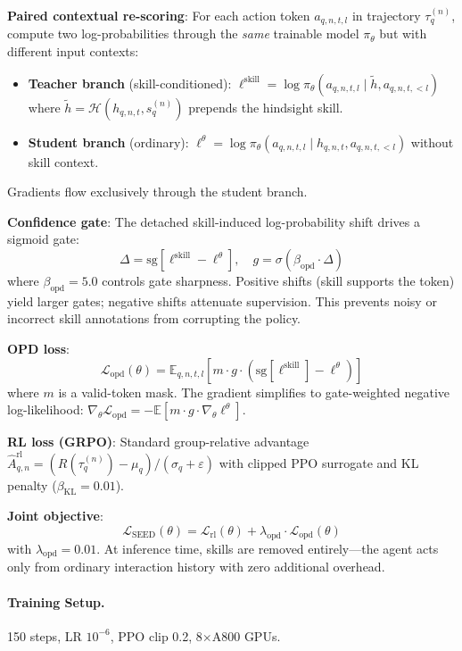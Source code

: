 \documentclass[11pt,a4paper]{article}
\begin{document}
\textbf{Paired contextual re-scoring}: For each action token $a_{q,n,t,l}$ in trajectory $\tau_q^{(n)}$, compute two log-probabilities through the \emph{same} trainable model $\pi_\theta$ but with different input contexts:
\begin{itemize}
\item \textbf{Teacher branch} (skill-conditioned): $\ell^{\mathrm{skill}} = \log \pi_\theta(a_{q,n,t,l} \mid \tilde{h}, a_{q,n,t,<l})$ where $\tilde{h} = \mathcal{H}(h_{q,n,t}, s_q^{(n)})$ prepends the hindsight skill.
\item \textbf{Student branch} (ordinary): $\ell^{\theta} = \log \pi_\theta(a_{q,n,t,l} \mid h_{q,n,t}, a_{q,n,t,<l})$ without skill context.
\end{itemize}
Gradients flow exclusively through the student branch.

\textbf{Confidence gate}: The detached skill-induced log-probability shift drives a sigmoid gate:
\[
\Delta = \mathrm{sg}[\ell^{\mathrm{skill}} - \ell^{\theta}], \quad g = \sigma(\beta_{\mathrm{opd}} \cdot \Delta)
\]
where $\beta_{\mathrm{opd}} = 5.0$ controls gate sharpness. Positive shifts (skill supports the token) yield larger gates; negative shifts attenuate supervision. This prevents noisy or incorrect skill annotations from corrupting the policy.

\textbf{OPD loss}:
\[
\mathcal{L}_{\mathrm{opd}}(\theta) = \mathbb{E}_{q,n,t,l}\!\left[m \cdot g \cdot \left(\mathrm{sg}[\ell^{\mathrm{skill}}] - \ell^{\theta}\right)\right]
\]
where $m$ is a valid-token mask. The gradient simplifies to gate-weighted negative log-likelihood: $\nabla_\theta \mathcal{L}_{\mathrm{opd}} = -\mathbb{E}[m \cdot g \cdot \nabla_\theta \ell^{\theta}]$.

\textbf{RL loss (GRPO)}: Standard group-relative advantage $\hat{A}_{q,n}^{\mathrm{rl}} = (R(\tau_q^{(n)}) - \mu_q)/(\sigma_q + \varepsilon)$ with clipped PPO surrogate and KL penalty ($\beta_{\mathrm{KL}} = 0.01$).

\textbf{Joint objective}:
\[
\mathcal{L}_{\mathrm{SEED}}(\theta) = \mathcal{L}_{\mathrm{rl}}(\theta) + \lambda_{\mathrm{opd}} \cdot \mathcal{L}_{\mathrm{opd}}(\theta)
\]
with $\lambda_{\mathrm{opd}} = 0.01$. At inference time, skills are removed entirely---the agent acts only from ordinary interaction history with zero additional overhead.

\paragraph{Training Setup.} 150 steps, LR $10^{-6}$, PPO clip 0.2, 8$\times$A800 GPUs.
\end{document}
